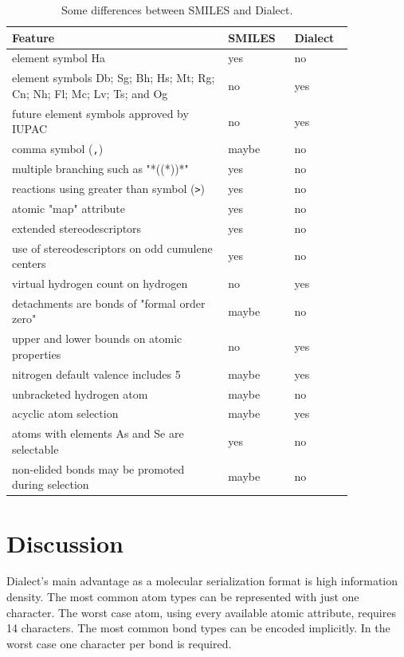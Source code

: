 \documentclass{article}
\def\ttt{\texttt}
\begin{document}
\begin{table}
    \caption{Some differences between SMILES and Dialect.}
    \centering
    \begin{tabular}{p{0.55\linewidth} p{0.15\linewidth} p{0.15\linewidth}}
        \hline
        Feature & SMILES & Dialect \\
        \hline
        element symbol Ha & yes & no \\
        element symbols Db; Sg; Bh; Hs; Mt; Rg; Cn; Nh; Fl; Mc; Lv; Ts; and Og & no & yes \\
        future element symbols approved by IUPAC & no & yes \\
        comma symbol (\ttt{,}) & maybe & no \\
        multiple branching such as "*((*))*" & yes & no \\
        reactions using greater than symbol (\ttt{>}) & yes & no \\
        atomic "map" attribute & yes & no \\
        extended stereodescriptors & yes & no \\
        use of stereodescriptors on odd cumulene centers & yes & no \\
        virtual hydrogen count on hydrogen & no & yes \\
        detachments are bonds of "formal order zero" & maybe & no \\
        upper and lower bounds on atomic properties & no & yes \\
        nitrogen default valence includes 5 & maybe & yes \\
        unbracketed hydrogen atom & maybe & no \\
        acyclic atom selection & maybe & yes \\
        atoms with elements As and Se are selectable & yes & no \\
        non-elided bonds may be promoted during selection & maybe & no \\
        \hline
    \end{tabular}
    \label{table:feature-comparison}
\end{table}

\section*{Discussion}

Dialect's main advantage as a molecular serialization format is high information density. The most common atom types can be represented with just one character. The worst case atom, using every available atomic attribute, requires 14 characters. The most common bond types can be encoded implicitly. In the worst case one character per bond is required.
\end{document}
